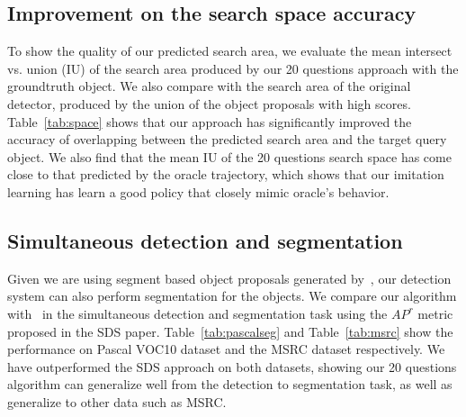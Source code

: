 \subsection{Improvement on the search space accuracy} To show the quality of our predicted search area, we evaluate the mean intersect vs. union (IU) of the search area produced by our 20 questions approach with the groundtruth object. We also compare with the search area of the original detector, produced by the union of the object proposals with high scores. Table~\ref{tab:space} shows that our approach has significantly improved the accuracy of overlapping between the predicted search area and the target query object.  We also find that the mean IU of the 20 questions search space has come close to that predicted by the oracle trajectory, which shows that our imitation learning has learn a good policy that closely mimic oracle's behavior.

\subsection{Simultaneous detection and segmentation}
Given we are using segment based object proposals generated by~\cite{arbelaez2014multiscale}, our detection system can also perform segmentation for the objects. We compare our algorithm with~\cite{BharathECCV2014} in  the simultaneous detection and segmentation task using the $AP^r$ metric proposed in the SDS paper. Table~\ref{tab:pascalseg} and Table~\ref{tab:msrc} show the performance on Pascal VOC10 dataset and the MSRC dataset respectively. We have outperformed the SDS approach on both datasets, showing our 20 questions algorithm can generalize well from the detection to segmentation task, as well as generalize to other data such as MSRC.





